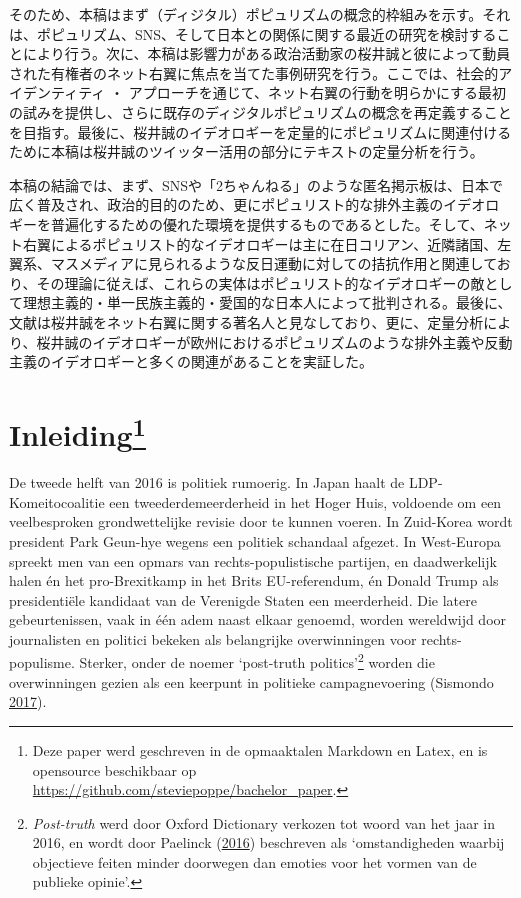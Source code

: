 \documentclass[10.5pt,dutch,]{article}
\begin{document}
そのため、本稿はまず（ディジタル）ポピュリズムの概念的枠組みを示す。それは、ポピュリズム、SNS、そして日本との関係に関する最近の研究を検討することにより行う。次に、本稿は影響力がある政治活動家の桜井誠と彼によって動員された有権者のネット右翼に焦点を当てた事例研究を行う。ここでは、社会的アイデンティティ
・
アプローチを通じて、ネット右翼の行動を明らかにする最初の試みを提供し、さらに既存のディジタルポピュリズムの概念を再定義することを目指す。最後に、桜井誠のイデオロギーを定量的にポピュリズムに関連付けるために本稿は桜井誠のツイッター活用の部分にテキストの定量分析を行う。

本稿の結論では、まず、SNSや「2ちゃんねる」のような匿名掲示板は、日本で広く普及され、政治的目的のため、更にポピュリスト的な排外主義のイデオロギーを普遍化するための優れた環境を提供するものであるとした。そして、ネット右翼によるポピュリスト的なイデオロギーは主に在日コリアン、近隣諸国、左翼系、マスメディアに見られるような反日運動に対しての拮抗作用と関連しており、その理論に従えば、これらの実体はポピュリスト的なイデオロギーの敵として理想主義的・単一民族主義的・愛国的な日本人によって批判される。最後に、文献は桜井誠をネット右翼に関する著名人と見なしており、更に、定量分析により、桜井誠のイデオロギーが欧州におけるポピュリズムのような排外主義や反動主義のイデオロギーと多くの関連があることを実証した。

\newpage


\section[Inleiding]{\texorpdfstring{Inleiding\footnote{Deze paper werd
  geschreven in de opmaaktalen Markdown en Latex, en is opensource
  beschikbaar op \url{https://github.com/steviepoppe/bachelor_paper}.}}{Inleiding}}\label{inleiding75}

De tweede helft van 2016 is politiek rumoerig. In Japan haalt de
LDP-Komeitocoalitie een tweederdemeerderheid in het Hoger Huis,
voldoende om een veelbesproken grondwettelijke revisie door te kunnen
voeren. In Zuid-Korea wordt president Park Geun-hye wegens een politiek
schandaal afgezet. In West-Europa spreekt men van een opmars van
rechts-populistische partijen, en daadwerkelijk halen én het
pro-Brexitkamp in het Brits EU-referendum, én Donald Trump als
presidentiële kandidaat van de Verenigde Staten een meerderheid. Die
latere gebeurtenissen, vaak in één adem naast elkaar genoemd, worden
wereldwijd door journalisten en politici bekeken als belangrijke
overwinningen voor rechts-populisme. Sterker, onder de noemer
`post-truth politics'\footnote{\emph{Post-truth} werd door Oxford
  Dictionary verkozen tot woord van het jaar in 2016, en wordt door
  Paelinck
  (\protect\hyperlink{ref-paelinckux5fpost-truthux5f2016}{2016})
  beschreven als `omstandigheden waarbij objectieve feiten minder
  doorwegen dan emoties voor het vormen van de publieke opinie'.} worden
die overwinningen gezien als een keerpunt in politieke campagnevoering
(Sismondo
\protect\hyperlink{ref-sismondoux5fpost-truthux3fux5f2017}{2017}).
\end{document}
